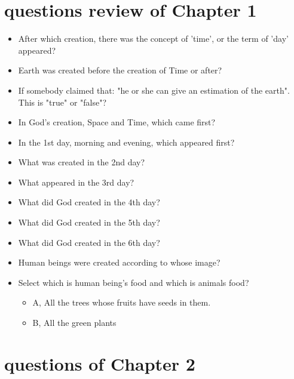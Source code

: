 \section{questions review of Chapter 1}
\begin{itemize}
\item After which creation, there was the concept of 'time', or the term of 'day' appeared? 
\item Earth was created before the creation of Time or after?
\item If somebody claimed that: "he or she can give an estimation of the earth". This is "true" or "false"?
\item In God's creation, Space and Time, which came first?
\item In the 1st day, morning and evening, which appeared first?

\item What was created in the 2nd day?
\item What appeared in the 3rd day?
\item What did God created in the 4th day?
\item What did God created in the 5th day?
\item What did God created in the 6th day?

\item Human beings were created according to whose image?
\item Select which is human being’s food and which is animals food?
\begin{itemize}
\item A, All the trees whose fruits have seeds in them. 
\item B, All the green plants
\end{itemize}
\end{itemize}

\section{questions of Chapter 2}

